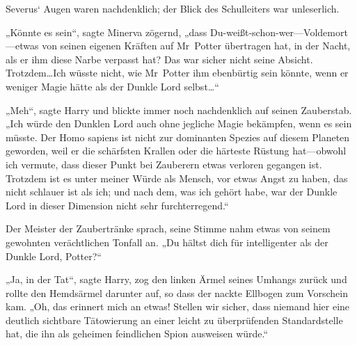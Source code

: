 Severus‘ Augen waren nachdenklich; der Blick des Schulleiters war unleserlich.

„Könnte es sein“, sagte Minerva zögernd, „dass Du-weißt-schon-wer—Voldemort—etwas von seinen eigenen Kräften auf Mr~Potter übertragen hat, in der Nacht, als er ihm diese Narbe verpasst hat? Das war sicher nicht seine Absicht. Trotzdem…Ich wüsste nicht, wie Mr~Potter ihm ebenbürtig sein könnte, wenn er weniger Magie hätte als der Dunkle Lord selbst…“

„Meh“, sagte Harry und blickte immer noch nachdenklich auf seinen Zauberstab. „Ich würde den Dunklen Lord auch ohne jegliche Magie bekämpfen, wenn es sein müsste. Der Homo sapiens ist nicht zur dominanten Spezies auf diesem Planeten geworden, weil er die schärfsten Krallen oder die härteste Rüstung hat—obwohl ich vermute, dass dieser Punkt bei Zauberern etwas verloren gegangen ist. Trotzdem ist es unter meiner Würde als Mensch, vor etwas Angst zu haben, das nicht schlauer ist als ich; und nach dem, was ich gehört habe, war der Dunkle Lord in dieser Dimension nicht sehr furchterregend.“

Der Meister der Zaubertränke sprach, seine Stimme nahm etwas von seinem gewohnten verächtlichen Tonfall an. „Du hältst dich für intelligenter als der Dunkle Lord, Potter?“

„Ja, in der Tat“, sagte Harry, zog den linken Ärmel seines Umhangs zurück und rollte den Hemdsärmel darunter auf, so dass der nackte Ellbogen zum Vorschein kam. „Oh, das erinnert mich an etwas! Stellen wir sicher, dass niemand hier eine deutlich sichtbare Tätowierung an einer leicht zu überprüfenden Standardstelle hat, die ihn als geheimen feindlichen Spion ausweisen würde.“

